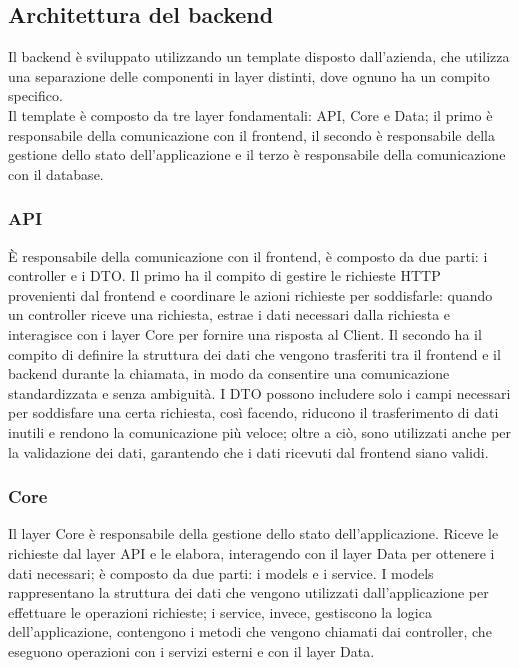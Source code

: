 \subsection{Architettura del backend}
Il backend è sviluppato utilizzando un template disposto dall'azienda, che utilizza una separazione delle componenti in layer distinti, dove ognuno ha un compito specifico.\\
Il template è composto da tre layer fondamentali: API, Core e Data; il primo è responsabile della comunicazione con il frontend, il secondo è responsabile della gestione dello stato dell'applicazione e il terzo è responsabile della comunicazione con il database.\\

\subsubsection{API}
È responsabile della comunicazione con il frontend, è composto da due parti: i controller e i DTO. Il primo ha il compito di gestire le richieste HTTP provenienti dal frontend e coordinare le azioni richieste per soddisfarle: quando un controller riceve una richiesta, estrae i dati necessari dalla richiesta e interagisce con i layer Core per fornire una risposta al Client. 
Il secondo ha il compito di definire la struttura dei dati che vengono trasferiti tra il frontend e il backend durante la chiamata, in modo da consentire una comunicazione standardizzata e senza ambiguità. I DTO possono includere solo i campi necessari per soddisfare una certa richiesta, così facendo, riducono il trasferimento di dati inutili e rendono la comunicazione più veloce; oltre a ciò, sono utilizzati anche per la validazione dei dati, garantendo che i dati ricevuti dal frontend siano validi.\\
\subsubsection{Core}
Il layer Core è responsabile della gestione dello stato dell'applicazione. Riceve le richieste dal layer API e le elabora, interagendo con il layer Data per ottenere i dati necessari; è composto da due parti: i models e i service. I models rappresentano la struttura dei dati che vengono utilizzati dall'applicazione per effettuare le operazioni richieste; i service, invece, gestiscono la logica dell'applicazione, contengono i metodi che vengono chiamati dai controller, che eseguono operazioni con i servizi esterni e con il layer Data.\\

